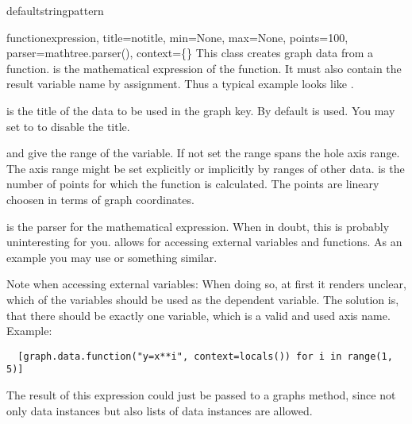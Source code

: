 \begin{memberdesc}{defaultstringpattern}
\end{memberdesc}

\begin{classdesc}{function}{expression, title=notitle,
                            min=None, max=None, points=100,
                            parser=mathtree.parser(),
                            context=\{\}}
  This class creates graph data from a function.  is
  the mathematical expression of the function. It must also contain
  the result variable name by assignment. Thus a typical example looks
  like .

   is the title of the data to be used in the graph key. By
  default  is used. You may set  to
   to disable the title.

   and  give the range of the variable. If not set
  the range spans the hole axis range. The axis range might be set
  explicitly or implicitly by ranges of other data.  is
  the number of points for which the function is calculated. The
  points are lineary choosen in terms of graph coordinates.

   is the parser for the mathematical expression. When in
  doubt, this is probably uninteresting for you.  allows
  for accessing external variables and functions. As an example you
  may use  or something similar.

  Note when accessing external variables: When doing so, at first it
  renders unclear, which of the variables should be used as the
  dependent variable. The solution is, that there should be exactly
  one variable, which is a valid and used axis name.
  Example:
  \begin{verbatim}
  [graph.data.function("y=x**i", context=locals()) for i in range(1, 5)]
  \end{verbatim}
  The result of this expression could just be passed to a graphs
   method, since not only data instances but also lists
  of data instances are allowed.
\end{classdesc}

